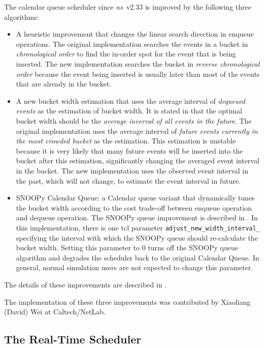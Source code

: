 The calendar queue scheduler since \emph{ns}~v2.33 is improved by the following
three algorithms:
\begin{itemize}
	\item A heuristic improvement that changes the linear search direction
in enqueue operations. The original implementation searches the events in
a bucket in \emph{chronological order} to find the in-order spot for the event
that is being inserted.
The new implementation searches the bucket in \emph{reverse chronological order}
because the event being inserted is usually later than most of the events that are
already in the bucket.
	\item A new bucket width estimation that uses the average interval of
\emph{dequeued events} as the estimation of bucket width. It is stated in
\cite{Brow88:Calendar} that the optimal bucket width should be the \emph{average inverval of all events in the future}.
The original implementation uses the average interval of \emph{future events currently in the most crowded bucket}
as the estimation. This estimation is unstable because it is very likely
that many future events will be inserted into the bucket after this estimation, significantly changing the
averaged event interval in the bucket. The new implementation uses the observed event interval 
in the past, which will not change, to estimate the event interval in future.
	\item SNOOPy Calendar Queue: a Calendar queue variant that dynamically
tunes the bucket width according to the cost trade-off between enqueue
operation and dequeue operation.
The SNOOPy queue improvement is described in \cite{Tan00SNOOPyQueue}.
In this implementation, there is one tcl parameter {\tt adjust\_new\_width\_interval\_ }
specifying the interval with which the SNOOPy queue should re-calculate the bucket width.
Setting this parameter to 0 turns off the SNOOPy queue algorithm and degrades the scheduler
back to the original Calendar Queue. In general, normal simulation users are
not expected to change this parameter.
\end{itemize}
The details of these improvements are described in \cite{WeiCao06NSLinuxTCP}.

The implementation of these three improvements was contributed by Xiaoliang (David) Wei at Caltech/NetLab.

\subsection{The Real-Time Scheduler}
\label{sec:rtsched}

